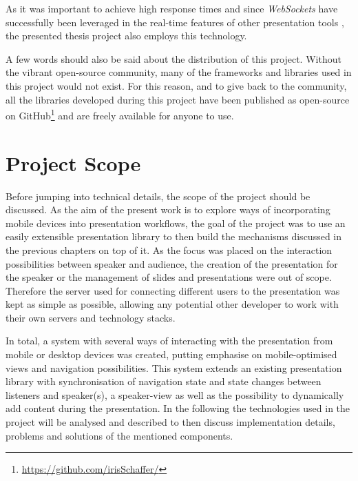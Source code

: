 As it was important to achieve high response times and since \emph{WebSockets} have successfully been leveraged in the real-time features of other presentation tools \cite{Inoue:RealTimeQuestionnaire, Triglianos:InteractiveWebPresentationsImpress}, the presented thesis project also employs this technology.

A few words should also be said about the distribution of this project. Without the vibrant open-source community, many of the frameworks and libraries used in this project would not exist. For this reason, and to give back to the community, all the libraries developed during this project have been published as open-source on GitHub\footnote{\href{https://github.com/irisSchaffer?tab=repositories}{\textsf{https://github.com/irisSchaffer/}}} and are freely available for anyone to use.

\section{Project Scope}
\label{sec:implementation-scope}
Before jumping into technical details, the scope of the project should be discussed. As the aim of the present work is to explore ways of incorporating mobile devices into presentation workflows, the goal of the project was to use an easily extensible presentation library to then build the mechanisms discussed in the previous chapters on top of it.
As the focus was placed on the interaction possibilities between speaker and audience, the creation of the presentation for the speaker or the management of slides and presentations were out of scope. Therefore the server used for connecting different users to the presentation was kept as simple as possible, allowing any potential other developer to work with their own servers and technology stacks.

In total, a system with several ways of interacting with the presentation from mobile or desktop devices was created, putting emphasise on mobile-optimised views and navigation possibilities. This system extends an existing presentation library with synchronisation of navigation state and state changes between listeners and speaker(s), a speaker-view as well as the possibility to dynamically add content during the presentation. In the following the technologies used in the project will be analysed and described to then discuss implementation details, problems and solutions of the mentioned components.

